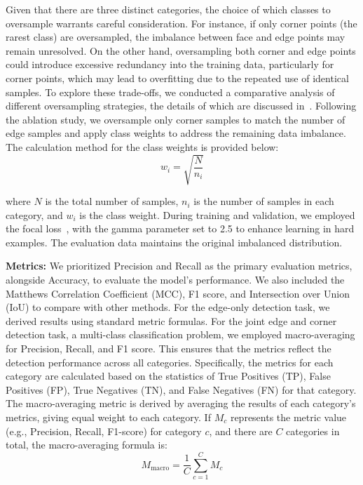 \documentclass[lettersize,journal]{IEEEtran}
\begin{document}
Given that there are three distinct categories, the choice of which classes to oversample warrants careful consideration. For instance, if only corner points (the rarest class) are oversampled, the imbalance between face and edge points may remain unresolved. On the other hand, oversampling both corner and edge points could introduce excessive redundancy into the training data, particularly for corner points, which may lead to overfitting due to the repeated use of identical samples. To explore these trade-offs, we conducted a comparative analysis of different oversampling strategies, the details of which are discussed in~. 
Following the ablation study, we oversample only corner samples to match the number of edge samples and apply class weights to address the remaining data imbalance.
The calculation method for the class weights is provided below:
\begin{equation}
    w_i = \sqrt{\frac{N}{n_i}}
    \label{eq:label_weights}
\end{equation}

where \( N \) is the total number of samples, \( n_i \) is the number of samples in each category, and \( w_i \) is the class weight. During training and validation, we employed the focal loss~\cite{lin_focal_2020}, with the gamma parameter set to 2.5 to enhance learning in hard examples. The evaluation data maintains the original imbalanced distribution.

\textbf{Metrics: }
We prioritized Precision and Recall as the primary evaluation metrics, alongside Accuracy, to evaluate the model's performance. We also included the Matthews Correlation Coefficient (MCC), F1 score, and Intersection over Union (IoU) to compare with other methods.
For the edge-only detection task, we derived results using standard metric formulas. For the joint edge and corner detection task, a multi-class classification problem, we employed macro-averaging for Precision, Recall, and F1 score. This ensures that the metrics reflect the detection performance across all categories.
Specifically, the metrics for each category are calculated based on the statistics of True Positives (TP), False Positives (FP), True Negatives (TN), and False Negatives (FN) for that category. The macro-averaging metric is derived by averaging the results of each category’s metrics, giving equal weight to each category. If \( M_c \) represents the metric value (e.g., Precision, Recall, F1-score) for category \( c \), and there are \( C \) categories in total, the macro-averaging formula is:
\begin{equation}
    M_{\text{macro}} = \frac{1}{C} \sum_{c=1}^{C} M_c
\end{equation}
\end{document}
